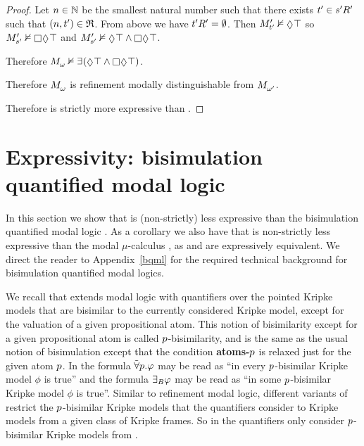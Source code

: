 \begin{proof}
Let $n \in \mathbb{N}$ be the smallest natural number such that there exists ${t}^{\prime} \in {{s}^{\prime}} {R^{\prime}_{}}$ such that $(n, {t}^{\prime}) \in \mathfrak{R}$.
From above we have ${{t}^{\prime}} {R^{\prime}_{}} = \emptyset$. 
Then $\kPModelP{\kStateTP} \nentails \possible \top$ so $\kPModelP{\kStateSP} \nentails \necessary \possible \top$ and $\kPModelP{\kStateSP} \nentails \possible \top \land \necessary \possible \top$.

Therefore $\kPModel{\omega} \nentails \somerefs (\possible \top \land \necessary \possible \top)$.

Therefore $\kPModel{\omega}$ is refinement modally distinguishable from $\kPModel{\omega'}$.

Therefore \logicRmlKF{} is strictly more expressive than \logicKF{}.
\end{proof}

\section{Expressivity: bisimulation quantified modal logic}\label{rml-k4-bqml}

In this section we show that \logicRmlKF{} is (non-strictly) less expressive than the bisimulation quantified modal logic \logicBqmlKF{}.
As a corollary we also have that \logicRmlKF{} is non-strictly less expressive than the modal $\mu$-calculus \logicMuKF{}, as \logicBqmlKF{} and \logicMuKF{} are expressively equivalent.
We direct the reader to Appendix~\ref{bqml} for the required technical background for bisimulation quantified modal logics.

We recall that \logicBqml{} extends modal logic with quantifiers over the pointed Kripke models that are bisimilar to the currently considered Kripke model, except for the valuation of a given propositional atom.
This notion of bisimilarity except for a given propositional atom is called $p$-bisimilarity, and is the same as the usual notion of bisimulation except that the condition {\bf atoms-$p$} is relaxed just for the given atom $p$.
In \logicBqml{} the formula ${\tilde\forall {p} . } \varphi$ may be read as ``in every $p$-bisimilar Kripke model $\phi$ is true'' and the formula ${\exists_{B}} \varphi$ may be read as ``in some $p$-bisimilar Kripke model $\phi$ is true''.
Similar to refinement modal logic, different variants of \logicBqml{} restrict the $p$-bisimilar Kripke models that the quantifiers consider to Kripke models from a given class of Kripke frames.
So in \logicBqmlKF{} the quantifiers only consider $p$-bisimilar Kripke models from \classKF{}.

